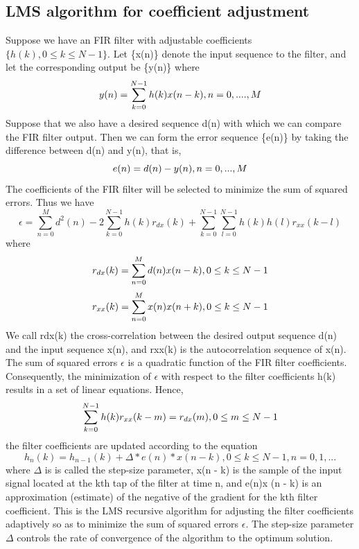 \documentclass{article}
\begin{document}
\subsection{LMS algorithm for coefficient adjustment}
Suppose we have an FIR filter with adjustable coefficients $\{h(k), 0 \leq k \leq N - 1\}.$ Let \{x(n)\} denote the input sequence to the filter, and let the corresponding output be \{y(n)\} where 
\begin{equation}
y(n) = \sum_{k=0}^{N-1}h(k)x(n-k), \space n =0,....,M 
\end{equation}
Suppose that we also have a desired sequence {d(n)} with which we can
compare the FIR filter output. Then we can form the error sequence
\{e(n)\} by taking the difference between d(n) and y(n), that is,
\begin{equation}
e(n) = d(n) - y(n), \space n = 0,...,M
\end{equation}
The coefficients of the FIR filter will be selected to minimize the sum of
squared errors. Thus we have
\begin{equation}
\epsilon = \sum_{n=0}^{M}d^2(n)-2\sum_{k=0}^{N-1}h(k)r_{dx}(k)+\sum_{k=0}^{N-1}\sum_{l=0}^{N-1}h(k)h(l)r_{xx}(k-l)
\end{equation}
where 
\begin{equation}
r_{dx}(k)= \sum_{n=0}^{M}d(n)x(n-k), \space0 \leq k \leq N -1
\end{equation}
\begin{equation}
r_{xx}(k)= \sum_{n=0}^{M}x(n)x(n+k), \space0 \leq k \leq N -1
\end{equation}
We call {rdx(k)} the cross-correlation between the desired output
sequence {d(n)} and the input sequence {x(n)}, and {rxx(k)} is the
autocorrelation sequence of {x(n)}. The sum of squared errors $\epsilon$ is a quadratic function of the FIR filter
coefficients. Consequently, the minimization of $\epsilon$ with respect to the filter
coefficients {h(k)} results in a set of linear equations. Hence, 
\begin{equation}
\sum_{k=0}^{N-1}h(k)r_{xx}(k-m)=r_{dx}(m), \space 0 \leq m \leq N -1
\end{equation}
the filter coefficients are updated according to the equation
\begin{equation}
h_n(k)=h_{n-1}(k)+\Delta *e(n)*x(n-k), 0 \leq k \leq N -1, n = 0,1,... 
\end{equation}
where $\Delta$ is is called the step-size parameter, x(n - k) is the sample of the
input signal located at the kth tap of the filter at time n, and e(n)x (n - k)
is an approximation (estimate) of the negative of the gradient for the kth
filter coefficient. This is the LMS recursive algorithm for adjusting the
filter coefficients adaptively so as to minimize the sum of squared errors $\epsilon$.
The step-size parameter $\Delta$ controls the rate of convergence of the
algorithm to the optimum solution.
\end{document}
